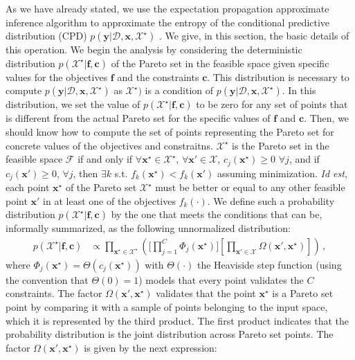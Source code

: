As we have already stated, we use the expectation propagation approximate inference algorithm to approximate the entropy of the
conditional predictive distribution (CPD) $p(\textbf{y}|\mathcal{D}, \textbf{x}, \mathcal{X}^{\star})$
\citep{minka2001expectation}. We give, in this section, the basic details of this operation. We begin the analysis by considering the deterministic distribution
$p(\mathcal{X}^{\star}|\textbf{f},\textbf{c})$ of the Pareto set
in the feasible space given specific values for the objectives $\textbf{f}$ and the constraints $\textbf{c}$. This distribution is necessary to compute $p(\textbf{y}|\mathcal{D}, \textbf{x}, \mathcal{X}^{\star})$ as $\mathcal{X}^{\star})$ is a condition of $p(\textbf{y}|\mathcal{D}, \textbf{x}, \mathcal{X}^{\star})$. In this distribution, we set the value of $p(\mathcal{X}^{\star}|\textbf{f},\textbf{c})$ to be zero for any set of points that is different from the actual Pareto set for the specific values of
$\mathbf{f}$ and $\mathbf{c}$. Then, we should know how to compute the set of points representing the Pareto set for concrete values of the objectives and constraitns. $\mathcal{X}^{\star}$ is the Pareto set in the feasible space $\mathcal{F}$ if and only if
$\forall \mathbf{x}^{\star} \in \mathcal{X}^{\star}$, $\forall \textbf{x}'\in\mathcal{X}$, $c_j(\mathbf{x}^\star) \geq 0$
$\forall j$, and if $c_j(\textbf{x}') \geq 0$, $\forall j$, then
$\exists k$ s.t. $f_k(\mathbf{x}^{\star}) < f_k(\textbf{x}')$ assuming minimization.
\textit{Id est}, each point $\mathbf{x}^\star$ of the Pareto set $\mathcal{X}^{\star}$ must be better or equal to any
other feasible point $\textbf{x}'$ in at least one of the objectives $f_k(\cdot)$.
We define such a probability distribution $p(\mathcal{X}^{\star}|\textbf{f},\textbf{c})$ by the one that meets the conditions that can be, informally summarized, as the following unnormalized distribution:
\begin{align}
p(\mathcal{X}^{\star}|\textbf{f},\textbf{c}) & \propto 
        \prod_{\textbf{x}^\star\in \mathcal{X}^\star} 
        \left(
        \Bigg[\prod_{j=1}^{C}\Phi_j(\textbf{x}^{\star})\Bigg]
        \left[ 
        \prod_{\textbf{x}'\in \mathcal{X}} 
        \Omega(\textbf{x}',\textbf{x}^{\star})
        \right] 
        \right)
        \,,
        \label{eq:x_star}
\end{align}
where $\Phi_j(\mathbf{x}^\star) = \Theta(c_j(\mathbf{x}^\star))$ with
$\Theta(\cdot)$ the Heaviside step function (using the convention that $\Theta(0)=1$) models that every point validates the $C$ constraints. The factor $\Omega(\textbf{x}',\textbf{x}^{\star})$ validates that the point $\mathbf{x}^{\star}$ is a Pareto set point by comparing it with a sample of points belonging to the input space, which it is represented by the third product. The first product indicates that the probability distribution is the joint distribution across Pareto set points. The factor $\Omega(\textbf{x}',\textbf{x}^{\star})$ is given by the next expression:

